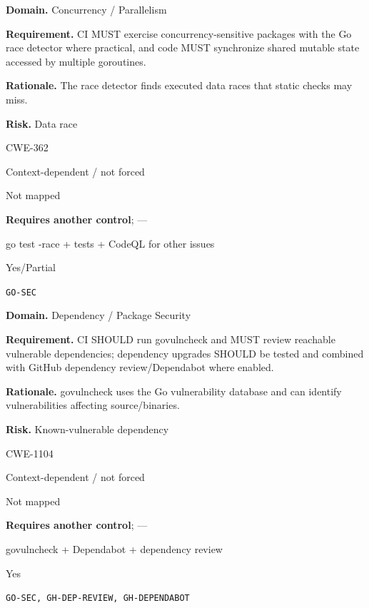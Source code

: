 \documentclass[10pt,letterpaper]{article}
\newcommand{\prioritybadge}[2]{\tcbox[on line,boxrule=0pt,arc=1.2mm,boxsep=0.7mm,left=1mm,right=1mm,top=0.4mm,bottom=0.4mm,colback=#2!12,coltext=#2]{\scriptsize\bfseries #1}}
\begin{document}
\begin{rulebox}[title={\texttt{SCS-GO-CONC-001} \hfill \prioritybadge{High Priority}{High}}]
\textbf{Domain.} Concurrency / Parallelism

\textbf{Requirement.} CI MUST exercise concurrency-sensitive packages with the Go race detector where practical, and code MUST synchronize shared mutable state accessed by multiple goroutines.

\textbf{Rationale.} The race detector finds executed data races that static checks may miss.

\textbf{Risk.} Data race

\begin{description}[leftmargin=2.65cm,labelwidth=2.3cm,style=nextline,itemsep=1pt,topsep=3pt]
  \item[CWE] CWE-362
  \item[OWASP] Context-dependent / not forced
  \item[CERT] Not mapped
  \item[CodeQL] \textbf{Requires another control}; ---
  \item[Enforcement] go test -race + tests + CodeQL for other issues
  \item[Automation] Yes/Partial
  \item[Sources] \texttt{GO-SEC}
\end{description}
\end{rulebox}

\begin{rulebox}[title={\texttt{SCS-GO-DEP-001} \hfill \prioritybadge{High Priority}{High}}]
\textbf{Domain.} Dependency / Package Security

\textbf{Requirement.} CI SHOULD run govulncheck and MUST review reachable vulnerable dependencies; dependency upgrades SHOULD be tested and combined with GitHub dependency review/Dependabot where enabled.

\textbf{Rationale.} govulncheck uses the Go vulnerability database and can identify vulnerabilities affecting source/binaries.

\textbf{Risk.} Known-vulnerable dependency

\begin{description}[leftmargin=2.65cm,labelwidth=2.3cm,style=nextline,itemsep=1pt,topsep=3pt]
  \item[CWE] CWE-1104
  \item[OWASP] Context-dependent / not forced
  \item[CERT] Not mapped
  \item[CodeQL] \textbf{Requires another control}; ---
  \item[Enforcement] govulncheck + Dependabot + dependency review
  \item[Automation] Yes
  \item[Sources] \texttt{GO-SEC, GH-DEP-REVIEW, GH-DEPENDABOT}
\end{description}
\end{rulebox}
\end{document}
